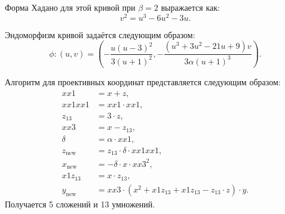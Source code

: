 Форма Хадано для этой кривой при \( \beta = 2 \) выражается как:
\begin{equation*}
    v^2 = u^3 - 6u^2 - 3u.
\end{equation*}

Эндоморфизм кривой задаётся следующим образом:
\begin{equation*}
    \phi:(u,v) = \left(-\frac{u(u-3)^2}{3(u+1)^2}, -\frac{(u^3+3u^2-21u+9)v}{3\alpha(u+1)^3}\right).
\end{equation*}

Алгоритм для проективных координат представляется следующим образом:
\begin{align*}
    xx1 &= x + z, \\
    xx1xx1 &= xx1 \cdot xx1, \\
    z_{13} &= 3 \cdot z, \\
    xx3 &= x - z_{13}, \\
    \delta &= \alpha \cdot xx1, \\
    z_{\text{new}} &= z_{13} \cdot \delta \cdot xx1xx1, \\
    x_{\text{new}} &= -\delta \cdot x \cdot xx3^2, \\
    x1z_{13} &= x \cdot z_{13}, \\
    y_{\text{new}} &= xx3 \cdot (x^2 + x1z_{13} + x1z_{13} - z_{13} \cdot z) \cdot y.
\end{align*}
Получается 5 сложений и 13 умножений.
